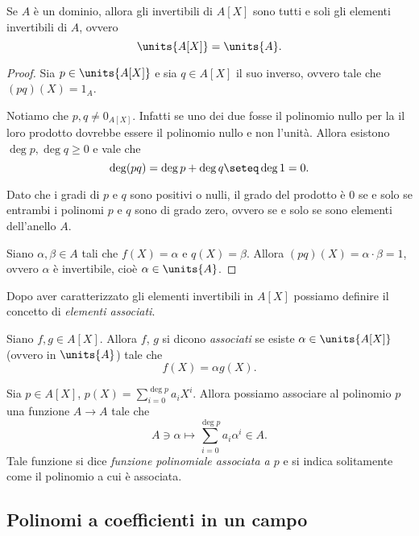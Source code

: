 \begin{corollary}
    Se $A$ è un dominio, allora gli invertibili di $A[X]$ sono tutti e soli gli elementi invertibili di $A$, ovvero \[
        \units{A[X]} = \units{A}. 
    \]
\end{corollary}
\begin{proof}
    Sia $p \in \units{A[X]}$ e sia $q \in A[X]$ il suo inverso, ovvero tale che $(pq)(X) = 1_A$.

    Notiamo che $p, q \neq 0_{A[X]}$. Infatti se uno dei due fosse il polinomio nullo per la  il loro prodotto dovrebbe essere il polinomio nullo e non l'unità. Allora esistono $\deg p, \deg q \geq 0$ e vale che \[
        \deg (pq) = \deg p + \deg q \seteq \deg 1 = 0.    
    \]

    Dato che i gradi di $p$ e $q$ sono positivi o nulli, il grado del prodotto è $0$ se e solo se entrambi i polinomi $p$ e $q$ sono di grado zero, ovvero se e solo se sono elementi dell'anello $A$.

    Siano $\alpha, \beta \in A$ tali che $f(X) = \alpha$ e $q(X) = \beta$. Allora $(pq)(X) = \alpha \cdot \beta = 1$, ovvero $\alpha$ è invertibile, cioè $\alpha \in \units{A}$.
\end{proof}

Dopo aver caratterizzato gli elementi invertibili in $A[X]$ possiamo definire il concetto di \emph{elementi associati}.

\begin{definition}
    Siano $f, g \in A[X]$. Allora $f$, $g$ si dicono \emph{associati} se esiste $\alpha \in \units{A[X]}$ (ovvero in $\units{A}$) tale che \[
        f(X) = \alpha g(X).    
    \]
\end{definition}

\begin{definition}
    Sia $p \in A[X]$, $p(X) = \sum_{i = 0}^{\deg p} a_iX^i$. Allora possiamo associare al polinomio $p$ una funzione $A \to A$ tale che \begin{equation}
        A \ni \alpha \mapsto \sum_{i = 0}^{\deg p} a_i{\alpha}^i \in A.
    \end{equation} Tale funzione si dice \emph{funzione polinomiale associata a $p$} e si indica solitamente come il polinomio a cui è associata.
\end{definition}

\subsection{Polinomi a coefficienti in un campo}

